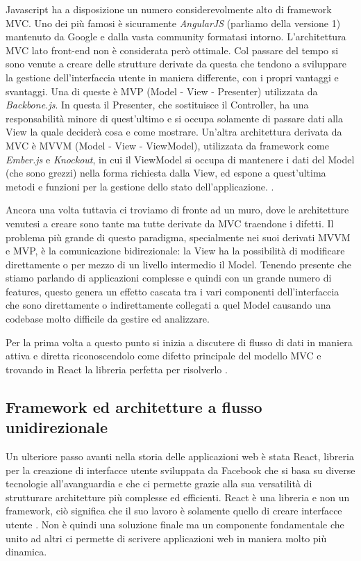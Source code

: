 Javascript ha a disposizione un numero considerevolmente alto di framework MVC. Uno dei più famosi è sicuramente \textit{AngularJS} (parliamo della versione 1) mantenuto da Google e dalla vasta community formatasi intorno.
L'architettura MVC lato front-end non è considerata però ottimale. Col passare del tempo si sono venute a creare delle strutture derivate da questa che tendono a sviluppare la gestione dell'interfaccia utente in maniera differente, con i propri vantaggi e svantaggi. Una di queste è MVP (Model - View - Presenter) utilizzata da \textit{Backbone.js}. In questa il Presenter, che sostituisce il Controller, ha una responsabilità minore di quest'ultimo e si occupa solamente di passare dati alla View la quale deciderà cosa e come mostrare. Un'altra architettura derivata da MVC è MVVM (Model - View - ViewModel), utilizzata da framework come \textit{Ember.js} e \textit{Knockout}, in cui il ViewModel si occupa di mantenere i dati del Model (che sono grezzi) nella forma richiesta dalla View, ed espone a quest'ultima metodi e funzioni per la gestione dello stato dell'applicazione. \cite{ChauhanFrontendArchitectures}.

Ancora una volta tuttavia ci troviamo di fronte ad un muro, dove le architetture venutesi a creare sono tante ma tutte derivate da MVC traendone i difetti. Il problema più grande di questo paradigma, specialmente nei suoi derivati MVVM e MVP, è la comunicazione bidirezionale: la View ha la possibilità di modificare direttamente o per mezzo di un livello intermedio il Model. Tenendo presente che stiamo parlando di applicazioni complesse e quindi con un grande numero di features, questo genera un effetto cascata tra i vari componenti dell'interfaccia che sono direttamente o indirettamente collegati a quel Model causando una codebase molto difficile da gestire ed analizzare. 

Per la prima volta a questo punto si inizia a discutere di flusso di dati in maniera attiva e diretta riconoscendolo come difetto principale del modello MVC e trovando in React la libreria perfetta per risolverlo \cite{SalihefendicFluxVsMVC}.

\subsection{Framework ed architetture a flusso unidirezionale}
Un ulteriore passo avanti nella storia delle applicazioni web è stata React, libreria per la creazione di interfacce utente sviluppata da Facebook che si basa su diverse tecnologie all'avanguardia e che ci permette grazie alla sua versatilità di strutturare architetture più complesse ed efficienti.
React è una libreria e non un framework, ciò significa che il suo lavoro è solamente quello di creare interfacce utente \cite{BunaReactIsTheNewFrontend}. Non è quindi una soluzione finale ma un componente fondamentale che unito ad altri ci permette di scrivere applicazioni web in maniera molto più dinamica.

